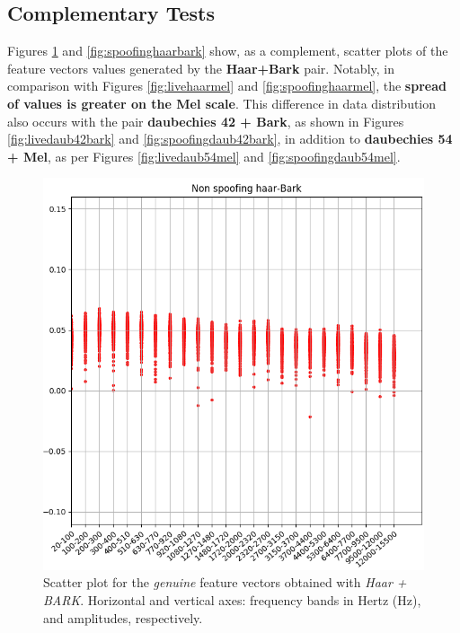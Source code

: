 \subsection{Complementary Tests}
\par Figures \ref{fig:livehaarbark} and \ref{fig:spoofinghaarbark} show, as a complement, scatter plots of the feature vectors values generated by the \textbf{Haar+Bark} pair. Notably, in comparison with Figures \ref{fig:livehaarmel} and \ref{fig:spoofinghaarmel}, the \textbf{spread of values is greater on the Mel scale}. This difference in data distribution also occurs with the pair \textbf{daubechies 42 + Bark}, as shown in Figures \ref{fig:livedaub42bark} and \ref{fig:spoofingdaub42bark}, in addition to \textbf{daubechies 54 + Mel}, as per Figures \ref{fig:livedaub54mel} and \ref{fig:spoofingdaub54mel}. 
\begin{figure}
\centering
\includegraphics[scale=.53]{images/results/barkVersusMel/liveHaarBark}
\caption{Scatter plot for the \textit{genuine} feature vectors obtained with \textit{Haar + BARK}. Horizontal and vertical axes: frequency bands in Hertz (Hz), and amplitudes, respectively.}
\label{fig:livehaarbark}
\end{figure}
